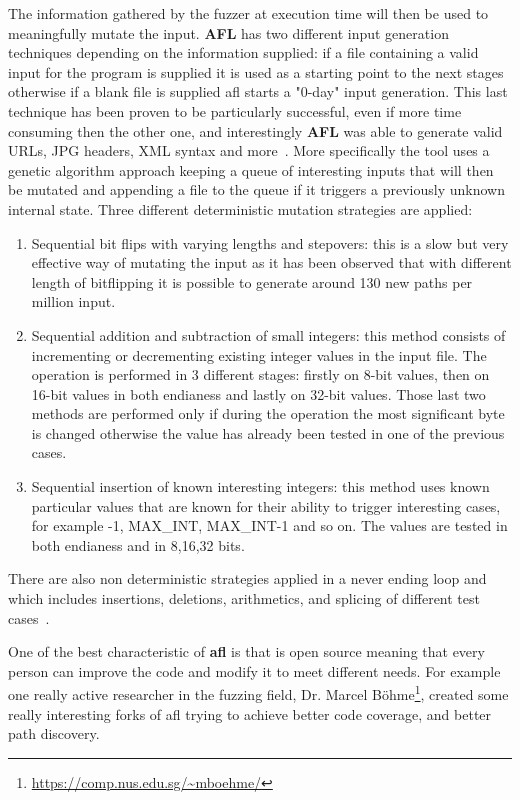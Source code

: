 \documentclass[../main.tex]{subfiles}
\begin{document}
The information gathered by the fuzzer at execution time will then be used to meaningfully mutate the input. \textbf{AFL} has two different input generation techniques depending on the information supplied: if a file containing a valid input for the program is supplied it is used as a starting point to the next stages otherwise if a blank file is supplied afl starts a "0-day" input generation. This last technique has been proven to be particularly successful, even if more time consuming then the other one, and interestingly \textbf{AFL} was able to generate valid URLs, JPG headers, XML syntax and more~\cite{aflblog}. More specifically the tool uses a genetic algorithm approach keeping a queue of interesting inputs that will then be mutated and appending a file to the queue if it triggers a previously unknown internal state. Three different deterministic mutation strategies are applied:
\begin{enumerate}
  \item Sequential bit flips with varying lengths and stepovers: this is a slow but very effective way of mutating the input as it has been observed that with different length of bitflipping it is possible to generate around 130 new paths per million input.
  \item Sequential addition and subtraction of small integers: this method consists of incrementing or decrementing existing integer values in the input file. The operation is performed in 3 different stages: firstly on 8-bit values, then on 16-bit values in both endianess and lastly on 32-bit values. Those last two methods are performed only if during the operation the most significant byte is changed otherwise the value has already been tested in one of the previous cases.
  \item Sequential insertion of known interesting integers: this method uses known particular values that are known for their ability to trigger interesting cases, for example -1, MAX\_INT, MAX\_INT-1 and so on. The values are tested in both endianess and in 8,16,32 bits.
\end{enumerate}
There are also non deterministic strategies applied in a never ending loop and which includes insertions, deletions, arithmetics, and splicing of different test cases~\cite{afltech}.

One of the best characteristic of \textbf{\acrshort{afl}} is that is open source meaning that every person can improve the code and modify it to meet different needs. For example one really active researcher in the fuzzing field, Dr. Marcel B\"ohme\footnote{\url{https://comp.nus.edu.sg/~mboehme/}}, created some really interesting forks of afl trying to achieve better code coverage\cite{aflfast}\cite{greybf}, and better path discovery\cite{pythia}.
\end{document}
